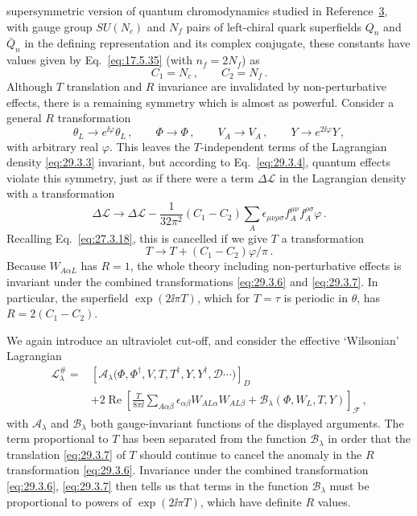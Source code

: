 supersymmetric version of quantum chromodynamics studied in
Reference~\hyperref[ch29-ref-3]{3}, with gauge group \(SU(N_c)\) and
\(N_f\) pairs of left-chiral quark superfields \(Q_n\) and \(\bar Q_n\)
in the defining representation and its complex conjugate, these constants
have values given by Eq.~\eqref{eq:17.5.35} (with \(n_f=2N_f\)) as
\[
  C_1=N_c\,,
  \qquad
  C_2=N_f\,.
\]
Although \(T\) translation and \(R\) invariance are invalidated by
non-perturbative effects, there is a remaining symmetry which is almost as
powerful. Consider a general \(R\) transformation
\begin{equation}
  \theta_L\longrightarrow e^{\ii\varphi}\theta_L\,,
  \qquad
  \Phi\longrightarrow\Phi\,,
  \qquad
  V_A\longrightarrow V_A\,,
  \qquad
  Y\longrightarrow e^{2\ii\varphi}Y\,,
  \tag{29.3.6}\label{eq:29.3.6}
\end{equation}
with arbitrary real \(\varphi\). This leaves the \(T\)-independent terms
of the Lagrangian density \eqref{eq:29.3.3} invariant, but according to
Eq.~\eqref{eq:29.3.4}, quantum effects violate this symmetry, just as if
there were a term \(\Delta\mathcal{L}\) in the Lagrangian density with a
transformation
\[
  \Delta\mathcal{L}
  \longrightarrow
  \Delta\mathcal{L}
  -\frac{1}{32\pi^2}(C_1-C_2)
  \sum_A\epsilon_{\mu\nu\rho\sigma}
  f_A^{\mu\nu}f_A^{\rho\sigma}\varphi\,.
\]
Recalling Eq.~\eqref{eq:27.3.18}, this is cancelled if we give \(T\) a
transformation
\begin{equation}
  T\longrightarrow T+(C_1-C_2)\varphi/\pi\,.
  \tag{29.3.7}\label{eq:29.3.7}
\end{equation}
Because \(W_{A\alpha L}\) has \(R=1\), the whole theory including
non-perturbative effects is invariant under the combined transformations
\eqref{eq:29.3.6} and \eqref{eq:29.3.7}. In particular, the superfield
\(\exp(2\ii\pi T)\), which for \(T=\tau\) is periodic in \(\theta\), has
\(R=2(C_1-C_2)\).

We again introduce an ultraviolet cut-off, and consider the effective
`Wilsonian' Lagrangian
\begin{equation}
  \begin{aligned}
  \mathcal{L}^{\#}_\lambda
  ={}&
  \left[
    \mathcal{A}_\lambda
    \bigl(\Phi,\Phi^\dagger,V,T,T^\dagger,Y,Y^\dagger,
    \mathcal{D}\cdots\bigr)
  \right]_D
  \\
  &+2\operatorname{Re}
  \left[
    \frac{T}{8\pi \ii}
    \sum_{A\alpha\beta}
    \epsilon_{\alpha\beta}W_{AL\alpha}W_{AL\beta}
    +\mathcal{B}_\lambda(\Phi,W_L,T,Y)
  \right]_{\mathcal{F}}\,,
  \end{aligned}
  \tag{29.3.8}\label{eq:29.3.8}
\end{equation}
with \(\mathcal{A}_\lambda\) and \(\mathcal{B}_\lambda\) both
gauge-invariant functions of the displayed arguments. The term
proportional to \(T\) has been separated from the function
\(\mathcal{B}_\lambda\) in order that the translation
\eqref{eq:29.3.7} of \(T\) should continue to cancel the anomaly in the
\(R\) transformation \eqref{eq:29.3.6}. Invariance under the combined
transformation \eqref{eq:29.3.6}, \eqref{eq:29.3.7} then tells us that
terms in the function \(\mathcal{B}_\lambda\) must be proportional to
powers of \(\exp(2\ii\pi T)\), which have definite \(R\) values.

